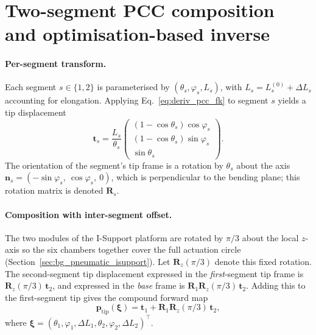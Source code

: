 \section{Two-segment PCC composition and optimisation-based inverse}
\label{app:deriv_pcc_multi}

\paragraph{Per-segment transform.}
Each segment $s \in \{1, 2\}$ is parameterised by $(\theta_{s}, \varphi_{s}, L_{s})$, with $L_{s} = L_{s}^{(0)} + \Delta L_{s}$ accounting for elongation. Applying Eq.~\eqref{eq:deriv_pcc_fk} to segment $s$ yields a tip displacement
\begin{equation}
  \mathbf{t}_{s} = \frac{L_{s}}{\theta_{s}} \begin{pmatrix} (1 - \cos\theta_{s})\cos\varphi_{s} \\ (1 - \cos\theta_{s})\sin\varphi_{s} \\ \sin\theta_{s} \end{pmatrix}.
\end{equation}
The orientation of the segment's tip frame is a rotation by $\theta_{s}$ about the axis $\mathbf{n}_{s} = (-\sin\varphi_{s},\ \cos\varphi_{s},\ 0)$, which is perpendicular to the bending plane; this rotation matrix is denoted $\mathbf{R}_{s}$.

\paragraph{Composition with inter-segment offset.}
The two modules of the I-Support platform are rotated by $\pi/3$ about the local $z$-axis so the six chambers together cover the full actuation circle (Section~\ref{sec:bg_pneumatic_isupport}). Let $\mathbf{R}_{z}(\pi/3)$ denote this fixed rotation. The second-segment tip displacement expressed in the \emph{first}-segment tip frame is $\mathbf{R}_{z}(\pi/3)\, \mathbf{t}_{2}$, and expressed in the \emph{base} frame is $\mathbf{R}_{1} \mathbf{R}_{z}(\pi/3)\, \mathbf{t}_{2}$. Adding this to the first-segment tip gives the compound forward map
\begin{equation}
  \mathbf{p}_{\mathrm{tip}}(\boldsymbol{\xi}) = \mathbf{t}_{1} + \mathbf{R}_{1} \mathbf{R}_{z}(\pi/3)\, \mathbf{t}_{2},
  \label{eq:deriv_pcc_multi_fk}
\end{equation}
where $\boldsymbol{\xi} = (\theta_{1}, \varphi_{1}, \Delta L_{1}, \theta_{2}, \varphi_{2}, \Delta L_{2})^{\top}$.

